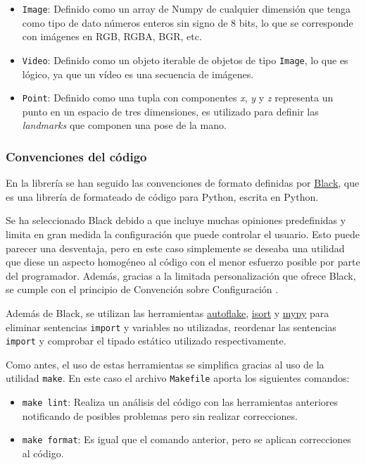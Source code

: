 \begin{itemize}
    \item \texttt{Image}: Definido como un array de Numpy de cualquier dimensión
    que tenga como tipo de dato números enteros sin signo de 8 bits, lo que se
    corresponde con imágenes en RGB, RGBA, BGR, etc.
    \item \texttt{Video}: Definido como un objeto iterable de objetos de tipo
    \texttt{Image}, lo que es lógico, ya que un vídeo es una secuencia de
    imágenes.
    \item \texttt{Point}: Definido como una tupla con componentes \textit{x},
    \textit{y} y \textit{z} representa un punto en un espacio de tres
    dimensiones, es utilizado para definir las \textit{landmarks} que componen
    una pose de la mano.
\end{itemize}

\subsubsection{Convenciones del código}

En la librería se han seguido las convenciones de formato definidas por
\href{https://github.com/psf/black}{Black}, que es una librería de formateado de
código para Python, escrita en Python.

Se ha seleccionado Black debido a que incluye muchas opiniones predefinidas y
limita en gran medida la configuración que puede controlar el usuario. Esto
puede parecer una desventaja, pero en este caso simplemente se deseaba una
utilidad que diese un aspecto homogéneo al código con el menor esfuerzo posible
por parte del programador. Además, gracias a la limitada personalización que
ofrece Black, se cumple con el principio de Convención sobre Configuración
\cite{eswiki:125269135}.

Además de Black, se utilizan las herramientas
\href{https://github.com/PyCQA/autoflake}{autoflake},
\href{https://github.com/PyCQA/isort}{isort} y
\href{https://github.com/python/mypy}{mypy} para eliminar sentencias
\texttt{import} y variables no utilizadas, reordenar las sentencias
\texttt{import} y comprobar el tipado estático utilizado respectivamente.

Como antes, el uso de estas herramientas se simplifica gracias al uso de la
utilidad \texttt{make}. En este caso el archivo \texttt{Makefile} aporta los
siguientes comandos:

\begin{itemize}
    \item \texttt{make lint}: Realiza un análisis del código con las
    herramientas anteriores notificando de posibles problemas pero sin realizar
    correcciones.
    \item \texttt{make format}: Es igual que el comando anterior, pero se
    aplican correcciones al código.
\end{itemize}

